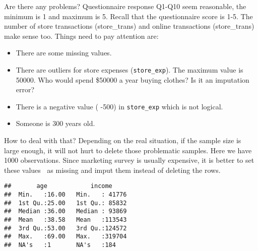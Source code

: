 \documentclass[
]{article}
\newenvironment{Shaded}{\begin{snugshade}}{\end{snugshade}}
\newcommand{\CommentTok}[1]{\textcolor[rgb]{0.56,0.35,0.01}{\textit{#1}}}
\newcommand{\DataTypeTok}[1]{\textcolor[rgb]{0.13,0.29,0.53}{#1}}
\newcommand{\DecValTok}[1]{\textcolor[rgb]{0.00,0.00,0.81}{#1}}
\newcommand{\KeywordTok}[1]{\textcolor[rgb]{0.13,0.29,0.53}{\textbf{#1}}}
\newcommand{\NormalTok}[1]{#1}
\newcommand{\OperatorTok}[1]{\textcolor[rgb]{0.81,0.36,0.00}{\textbf{#1}}}
\newcommand{\OtherTok}[1]{\textcolor[rgb]{0.56,0.35,0.01}{#1}}
\newcommand{\StringTok}[1]{\textcolor[rgb]{0.31,0.60,0.02}{#1}}
\providecommand{\tightlist}{%
  \setlength{\itemsep}{0pt}\setlength{\parskip}{0pt}}
\begin{document}
Are there any problems? Questionnaire response Q1-Q10 seem reasonable,
the minimum is 1 and maximum is 5. Recall that the questionnaire score
is 1-5. The number of store transactions (store\_trans) and online
transactions (store\_trans) make sense too. Things need to pay attention
are:

\begin{itemize}
\tightlist
\item
  There are some missing values.
\item
  There are outliers for store expenses (\texttt{store\_exp}). The
  maximum value is 50000. Who would spend \$50000 a year buying clothes?
  Is it an imputation error?
\item
  There is a negative value ( -500) in \texttt{store\_exp} which is not
  logical.
\item
  Someone is 300 years old.
\end{itemize}

How to deal with that? Depending on the real situation, if the sample
size is large enough, it will not hurt to delete those problematic
samples. Here we have 1000 observations. Since marketing survey is
usually expensive, it is better to set these values as missing and
imput them instead of deleting the rows.

\begin{Shaded}
\end{Shaded}

\begin{verbatim}
##       age            income      
##  Min.   :16.00   Min.   : 41776  
##  1st Qu.:25.00   1st Qu.: 85832  
##  Median :36.00   Median : 93869  
##  Mean   :38.58   Mean   :113543  
##  3rd Qu.:53.00   3rd Qu.:124572  
##  Max.   :69.00   Max.   :319704  
##  NA's   :1       NA's   :184
\end{verbatim}
\end{document}
